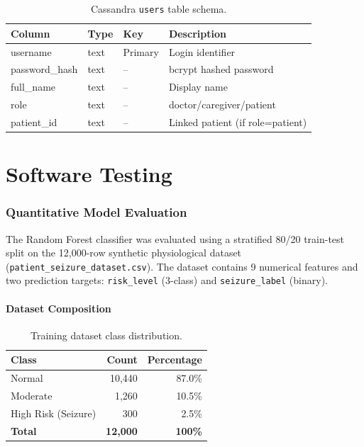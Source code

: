 \documentclass[12pt, a4paper, oneside]{report}
\newcommand{\chapterpage}[2]{%
    \cleardoublepage
    \thispagestyle{empty}
    \vspace*{\fill}
    \begin{center}
        \huge \textbf{Chapter #1} \\
        \vspace{1cm}
        \Huge #2
    \end{center}
    \vspace*{\fill}
    \newpage
}
\begin{document}
\begin{table}[h!]
\centering
\caption{Cassandra \texttt{users} table schema.}
\label{tab:userschema}
\small
\begin{tabular}{|l|l|l|p{4.5cm}|}
\hline
\textbf{Column} & \textbf{Type} & \textbf{Key} & \textbf{Description} \\ \hline
username & text & Primary & Login identifier \\ \hline
password\_hash & text & -- & bcrypt hashed password \\ \hline
full\_name & text & -- & Display name \\ \hline
role & text & -- & doctor/caregiver/patient \\ \hline
patient\_id & text & -- & Linked patient (if role=patient) \\ \hline
\end{tabular}
\end{table}


\chapter{Software Testing}

\subsection{Quantitative Model Evaluation}

The Random Forest classifier was evaluated using a stratified 80/20 train-test split on the 12,000-row synthetic physiological dataset (\texttt{patient\_seizure\_dataset.csv}). The dataset contains 9 numerical features and two prediction targets: \texttt{risk\_level} (3-class) and \texttt{seizure\_label} (binary).

\subsubsection{Dataset Composition}
\begin{table}[h!]
\centering
\caption{Training dataset class distribution.}
\label{tab:dataset}
\begin{tabular}{|l|r|r|}
\hline
\textbf{Class} & \textbf{Count} & \textbf{Percentage} \\ \hline
Normal & 10,440 & 87.0\% \\ \hline
Moderate & 1,260 & 10.5\% \\ \hline
High Risk (Seizure) & 300 & 2.5\% \\ \hline
\textbf{Total} & \textbf{12,000} & \textbf{100\%} \\ \hline
\end{tabular}
\end{table}
\end{document}
